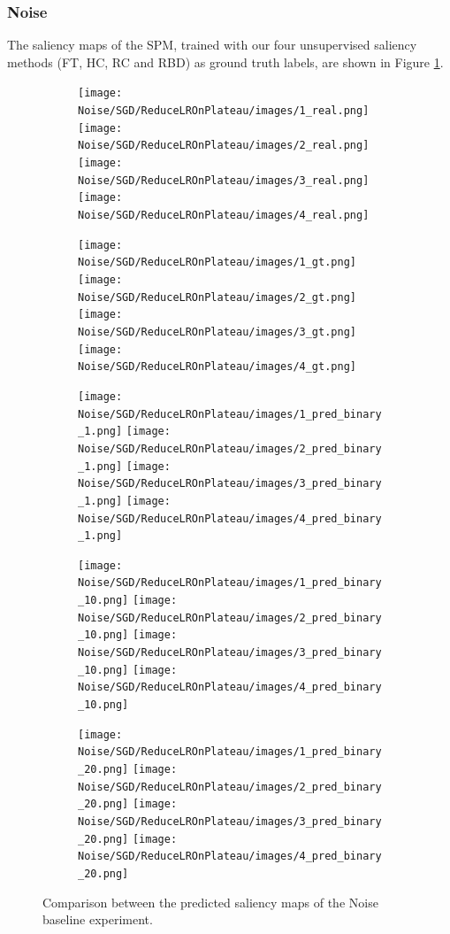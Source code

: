 \documentclass{article}
\begin{document}
\subsubsection{Noise}

The saliency maps of the SPM, trained with our four unsupervised saliency methods (FT, HC, RC and RBD) as ground truth labels, are shown in Figure \ref{fig:noise_sm}. 


\begin{figure}[p]
  \centering
  \begin{subfigure}[c]{0.19\textwidth}
    \centering
      \texttt{[image: Noise/SGD/ReduceLROnPlateau/images/1\_real.png]}
      \texttt{[image: Noise/SGD/ReduceLROnPlateau/images/2\_real.png]}
      \texttt{[image: Noise/SGD/ReduceLROnPlateau/images/3\_real.png]}
      \texttt{[image: Noise/SGD/ReduceLROnPlateau/images/4\_real.png]}
  \end{subfigure}
  \begin{subfigure}[c]{0.19\textwidth}
    \centering
      \texttt{[image: Noise/SGD/ReduceLROnPlateau/images/1\_gt.png]}
      \texttt{[image: Noise/SGD/ReduceLROnPlateau/images/2\_gt.png]}
      \texttt{[image: Noise/SGD/ReduceLROnPlateau/images/3\_gt.png]}
      \texttt{[image: Noise/SGD/ReduceLROnPlateau/images/4\_gt.png]}
  \end{subfigure}
  \begin{subfigure}[c]{0.19\textwidth}
    \centering
    \texttt{[image: Noise/SGD/ReduceLROnPlateau/images/1\_pred\_binary\_1.png]}
    \texttt{[image: Noise/SGD/ReduceLROnPlateau/images/2\_pred\_binary\_1.png]}
    \texttt{[image: Noise/SGD/ReduceLROnPlateau/images/3\_pred\_binary\_1.png]}
    \texttt{[image: Noise/SGD/ReduceLROnPlateau/images/4\_pred\_binary\_1.png]}
  \end{subfigure}
  \begin{subfigure}[c]{0.19\textwidth}
    \centering
    \texttt{[image: Noise/SGD/ReduceLROnPlateau/images/1\_pred\_binary\_10.png]}
    \texttt{[image: Noise/SGD/ReduceLROnPlateau/images/2\_pred\_binary\_10.png]}
    \texttt{[image: Noise/SGD/ReduceLROnPlateau/images/3\_pred\_binary\_10.png]}
    \texttt{[image: Noise/SGD/ReduceLROnPlateau/images/4\_pred\_binary\_10.png]}
  \end{subfigure}
  \begin{subfigure}[c]{0.19\textwidth}
    \centering
    \texttt{[image: Noise/SGD/ReduceLROnPlateau/images/1\_pred\_binary\_20.png]}
    \texttt{[image: Noise/SGD/ReduceLROnPlateau/images/2\_pred\_binary\_20.png]}
    \texttt{[image: Noise/SGD/ReduceLROnPlateau/images/3\_pred\_binary\_20.png]}
    \texttt{[image: Noise/SGD/ReduceLROnPlateau/images/4\_pred\_binary\_20.png]}
  \end{subfigure}
  \caption{Comparison between the predicted saliency maps of the Noise baseline experiment.}
  \label{fig:noise_sm}
\end{figure}
\end{document}
